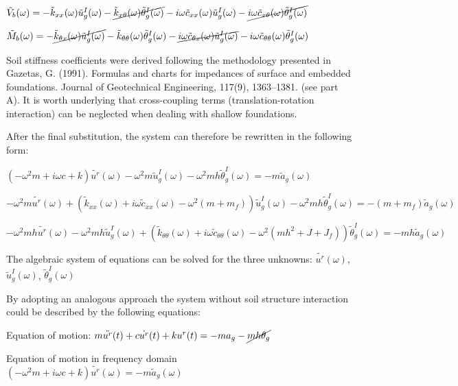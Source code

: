 \documentclass[11pt]{article}
\begin{document}
\(\tilde{V}_b(\omega) = - \tilde{k}_{xx}(\omega)\tilde{u}_g^I(\omega)-\cancel{\tilde{k}_{x\theta}(\omega)\tilde{\theta}_g^I(\omega)}-i\omega\tilde{c}_{xx}(\omega)\tilde{u}_g^I(\omega)-\cancel{i\omega\tilde{c}_{x\theta}(\omega)\tilde{\theta}_g^I(\omega)}\)

\(\tilde{M}_b(\omega) = - \cancel{\tilde{k}_{\theta x}(\omega)\tilde{u}_g^I(\omega)}-\tilde{k}_{\theta\theta}(\omega)\tilde{\theta}_g^I(\omega)-\cancel{i\omega\tilde{c}_{\theta x}(\omega)\tilde{u}_g^I(\omega)}-i\omega\tilde{c}_{\theta \theta}(\omega)\tilde{\theta}_g^I(\omega)\)

Soil stiffness coefficients were derived following the methodology
presented in Gazetas, G. (1991). Formulas and charts for impedances of
surface and embedded foundations. Journal of Geotechnical Engineering,
117(9), 1363--1381. (see part A). It is worth underlying that
cross-coupling terms (translation-rotation interaction) can be neglected
when dealing with shallow foundations.

After the final substitution, the system can therefore be rewritten in
the following form:

\((-\omega^2m + i\omega c + k)\tilde{u^r}(\omega) - \omega^2m\tilde{u}_g^I(\omega) - \omega^2mh\tilde{\theta}_g^I(\omega) = -m\tilde{a}_g(\omega)\)

\(-\omega^2m\tilde{u^r}(\omega) + (\tilde{k}_{xx}(\omega) + i\omega\tilde{c}_{xx}(\omega) - \omega^2(m + m_f))\tilde{u}_g^I(\omega) - \omega^2mh\tilde{\theta}_g^I(\omega) = -(m + m_f)\tilde{a}_g(\omega)\)

\(-\omega^2mh\tilde{u^r}(\omega) - \omega^2mh\tilde{u}_g^I(\omega) + (\tilde{k}_{\theta\theta}(\omega) + i\omega\tilde{c}_{\theta\theta}(\omega)- \omega^2(mh^2 + J + J_f))\tilde{\theta}_g^I(\omega) = -mh\tilde{a}_g(\omega)\)

The algebraic system of equations can be solved for the three unknowns:
\(\tilde{u^r}(\omega)\), \(\tilde{u}_g^I(\omega)\),
\(\tilde{\theta}_g^I(\omega)\)

By adopting an analogous approach the system without soil structure
interaction could be described by the following equations:

Equation of motion:
\(m\ddot{u^r}(t) + c\dot{u^r}(t) + ku^r(t) =  -ma_{g} - \cancel{mh\theta_{g}}\)

Equation of motion in frequency domain
\((-\omega^2m + i\omega c + k)\tilde{u^r}(\omega) = -m\tilde{a}_{g}(\omega)\)
\end{document}
